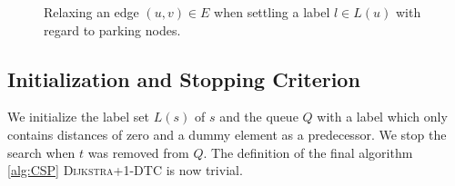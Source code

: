 \begin{figure}[hbtp]
	\setlength{\interspacetitleruled}{0pt}%
	\setlength{\algotitleheightrule}{0pt}%
	\begin{algorithm*}[H]
		\DontPrintSemicolon



	\end{algorithm*}
	\setlength{\interspacetitleruled}{2pt}%
	\setlength{\algotitleheightrule}{\algotitleheightruledefault}%

	\caption{\label{alg:relax_edge}Relaxing an edge $(u,v) \in E$ when settling a label $l \in L(u)$ with regard to parking nodes.}
\end{figure}

\subsection{Initialization and Stopping Criterion}
We initialize the label set $L(s)$ of $s$ and the queue $Q$ with a label which only contains distances of zero and a dummy element as a predecessor. We stop the search when $t$ was removed from $Q$. The definition of the final algorithm \ref{alg:CSP} \textsc{Dijkstra+1-DTC} is now trivial.

